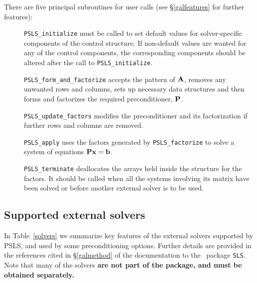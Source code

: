 \documentclass{galahad}
\newcommand{\packagename}{PSLS}
\begin{document}
\noindent There are five principal subroutines for user calls (see
\S\ref{galfeatures} for further features):

\begin{description}
\item[] {\tt \packagename\_initialize} must be called to
set default values for solver-specific components of the control structure.
If non-default values are
wanted for any of the control components, the corresponding components
should be altered after the call to {\tt \packagename\_initialize}.

\item[] {\tt \packagename\_form\_and\_factorize} accepts the pattern of ${\mathbf{A}}$,
 removes any unwanted rows and columns, sets up necessary data structures
 and then forms and factorizes the required preconditioner, ${\mathbf{P}}$.

\item[] {\tt \packagename\_update\_factors} modifies the preconditioner and
 its factorization if further rows and columns are removed.

\item[] {\tt \packagename\_apply} uses the factors generated by
  {\tt \packagename\_factorize} to
  solve a system of equations ${\mathbf{P}} {\mathbf{x}} = {\mathbf{b}}$.

\item[] {\tt \packagename\_terminate} deallocates the arrays held inside the
  structure for the factors. It should be called
  when all the systems involving its matrix have been solved
  or before another external solver is to be used.
\end{description}

\subsection{Supported external solvers}

In Table~\ref{solvers} we summarize key features of
the external solvers supported by \packagename, and used
by some preconditioning options. Further details
are provided in the references cited in \S\ref{galmethod} of the
documentation to the \libraryname\ package {\tt SLS}. Note that many
of the solvers {\bf are not part of the package, and must be obtained
separately.}
\end{document}
